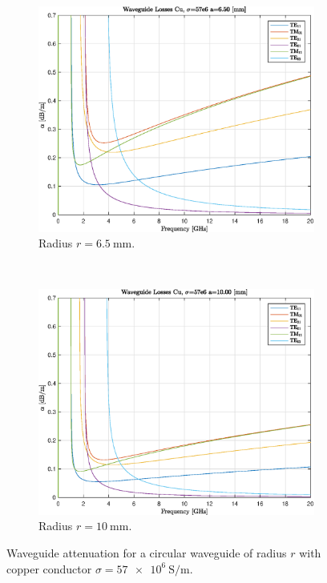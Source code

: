 \documentclass[english,twoside]{article}
\begin{document}
      
      \begin{figure}[H]
      	\centering			
      	\begin{subfigure}[b]{0.48\textwidth}
      		\includegraphics[width=\textwidth]{figures/wc13_attenuation}
      		\caption{Radius $r=\SI{6.5}{\milli\meter}$.}
      	\end{subfigure}
      	~
      	\begin{subfigure}[b]{0.48\textwidth}
      		\includegraphics[width=\textwidth]{figures/wc20_attenuation}
      		\caption{Radius $r=\SI{10}{\milli\meter}$.}
      	\end{subfigure}
      	\caption{Waveguide attenuation for a circular waveguide of radius $r$ with copper conductor $\sigma=\SI{57e6}{\siemens\per\metre}$.}
      	\label{fig:wc_attenuation}
      \end{figure}
      
\end{document}
